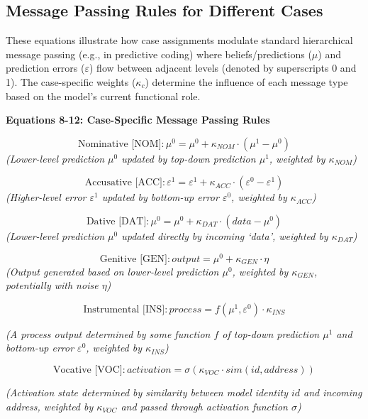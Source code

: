 \hypertarget{message-passing-rules-for-different-cases}{%
\subsection{Message Passing Rules for Different
Cases}\label{message-passing-rules-for-different-cases}}

These equations illustrate how case assignments modulate standard
hierarchical message passing (e.g., in predictive coding) where
beliefs/predictions (\(\mu\)) and prediction errors (\(\varepsilon\))
flow between adjacent levels (denoted by superscripts 0 and 1). The
case-specific weights (\(\kappa_c\)) determine the influence of each
message type based on the model's current functional role.

\textbf{Equations 8-12: Case-Specific Message Passing Rules}

\[\text{Nominative [NOM]}: \mu^0 = \mu^0 + \kappa_{NOM} \cdot (\mu^1 - \mu^0)  \tag{8}\]
\emph{(Lower-level prediction \(\mu^0\) updated by top-down prediction
\(\mu^1\), weighted by \(\kappa_{NOM}\))}

\[\text{Accusative [ACC]}: \varepsilon^1 = \varepsilon^1 + \kappa_{ACC} \cdot (\varepsilon^0 - \varepsilon^1)  \tag{9}\]
\emph{(Higher-level error \(\varepsilon^1\) updated by bottom-up error
\(\varepsilon^0\), weighted by \(\kappa_{ACC}\))}

\[\text{Dative [DAT]}: \mu^0 = \mu^0 + \kappa_{DAT} \cdot (data - \mu^0)  \tag{10}\]
\emph{(Lower-level prediction \(\mu^0\) updated directly by incoming
`data', weighted by \(\kappa_{DAT}\))}

\[\text{Genitive [GEN]}: output = \mu^0 + \kappa_{GEN} \cdot \eta  \tag{11}\]
\emph{(Output generated based on lower-level prediction \(\mu^0\),
weighted by \(\kappa_{GEN}\), potentially with noise \(\eta\))}

\[\text{Instrumental [INS]}: process = f(\mu^1, \varepsilon^0) \cdot \kappa_{INS} \tag{12}\]

\emph{(A process output determined by some function \(f\) of top-down
prediction \(\mu^1\) and bottom-up error \(\varepsilon^0\), weighted by
\(\kappa_{INS}\))}

\[\text{Vocative [VOC]}: activation = \sigma(\kappa_{VOC} \cdot sim(id, address)) \tag{12a}\]

\emph{(Activation state determined by similarity between model identity
\(id\) and incoming address, weighted by \(\kappa_{VOC}\) and passed
through activation function \(\sigma\))}

